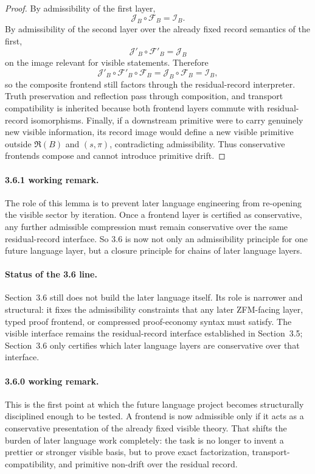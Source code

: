 \documentclass[12pt,a4paper]{article}
\begin{document}
\begin{proof}
By admissibility of the first layer,
\[
 \mathcal J_B\circ \mathcal F_B=\mathcal I_B.
\]
By admissibility of the second layer over the already fixed record semantics of the first,
\[
 \mathcal J'_B\circ \mathcal F'_B=\mathcal J_B
\]
on the image relevant for visible statements. Therefore
\[
 \mathcal J'_B\circ \mathcal F'_B\circ \mathcal F_B
 =\mathcal J_B\circ \mathcal F_B
 =\mathcal I_B,
\]
so the composite frontend still factors through the residual-record interpreter. Truth preservation and reflection pass through composition, and transport compatibility is inherited because both frontend layers commute with residual-record isomorphisms. Finally, if a downstream primitive were to carry genuinely new visible information, its record image would define a new visible primitive outside \(\mathfrak R(B)\) and \((s,\pi)\), contradicting admissibility. Thus conservative frontends compose and cannot introduce primitive drift.
\end{proof}

\paragraph{3.6.1 working remark.}
The role of this lemma is to prevent later language engineering from re-opening the visible sector by iteration. Once a frontend layer is certified as conservative, any further admissible compression must remain conservative over the same residual-record interface. So 3.6 is now not only an admissibility principle for one future language layer, but a closure principle for chains of later language layers.

\paragraph{Status of the 3.6 line.}
Section~3.6 still does not build the later language itself. Its role is narrower and structural: it fixes the admissibility constraints that any later ZFM-facing layer, typed proof frontend, or compressed proof-economy syntax must satisfy. The visible interface remains the residual-record interface established in Section~3.5; Section~3.6 only certifies which later language layers are conservative over that interface.



\paragraph{3.6.0 working remark.}
This is the first point at which the future language project becomes structurally disciplined enough to be tested. A frontend is now admissible only if it acts as a conservative presentation of the already fixed visible theory. That shifts the burden of later language work completely: the task is no longer to invent a prettier or stronger visible basis, but to prove exact factorization, transport-compatibility, and primitive non-drift over the residual record.
\end{document}
